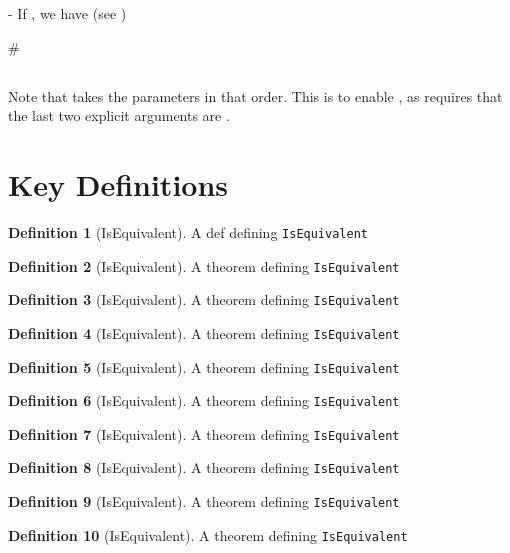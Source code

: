 \documentclass{article}
\theoremstyle{definition}
\newtheorem{definition}{Definition}
\begin{document}
- If \texttt{\1}, we have \texttt{\1}
  (see \texttt{\1})

#\subsection{\1}

Note that \texttt{\1} takes the parameters \texttt{\1} in that order.
This is to enable \texttt{\1} \support, as \texttt{\1} requires that the last two explicit arguments are \texttt{\1}.

\section{Key Definitions}
\begin{definition}[IsEquivalent]
A def defining \texttt{IsEquivalent}
\end{definition}

\begin{definition}[IsEquivalent]
A theorem defining \texttt{IsEquivalent}
\end{definition}

\begin{definition}[IsEquivalent]
A theorem defining \texttt{IsEquivalent}
\end{definition}

\begin{definition}[IsEquivalent]
A theorem defining \texttt{IsEquivalent}
\end{definition}

\begin{definition}[IsEquivalent]
A theorem defining \texttt{IsEquivalent}
\end{definition}

\begin{definition}[IsEquivalent]
A theorem defining \texttt{IsEquivalent}
\end{definition}

\begin{definition}[IsEquivalent]
A theorem defining \texttt{IsEquivalent}
\end{definition}

\begin{definition}[IsEquivalent]
A theorem defining \texttt{IsEquivalent}
\end{definition}

\begin{definition}[IsEquivalent]
A theorem defining \texttt{IsEquivalent}
\end{definition}

\begin{definition}[IsEquivalent]
A theorem defining \texttt{IsEquivalent}
\end{definition}
\end{document}

